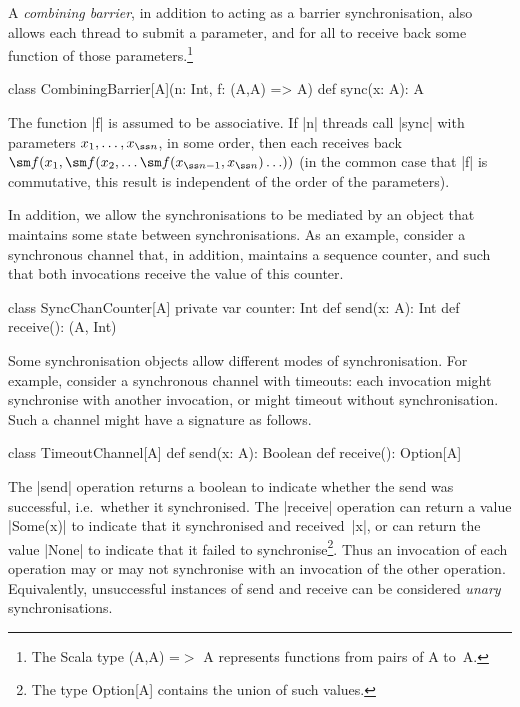 A \emph{combining barrier}, in addition to acting as a barrier
synchronisation, also allows each thread to submit a parameter, and for all to
receive back some function of those parameters.\footnote{The Scala type
  {\scalastyle (A,A) =}$>$ {\scalastyle A} represents functions from pairs of
  {\scalastyle A} to~{\scalastyle A}.}
%
\begin{scala}
class CombiningBarrier[A](n: Int, f: (A,A) => A){
  def sync(x: A): A
}
\end{scala}
%
The function |f| is assumed to be associative.  If |n| threads call |sync|
with parameters $x_1, \ldots, x_{\ss n}$, in some order, then each receives
back $\sm f(x_1, \sm f(x_2, \ldots \sm f(x_{{\ss n}-1}, x_{\ss n}) \ldots ))$
(in the common case that |f| is commutative, this result is independent of the
order of the parameters).

In addition, we allow the synchronisations to be mediated by an object that
maintains some state between synchronisations.  As an example, consider a
synchronous channel that, in addition, maintains a sequence counter, and such
that both invocations receive the value of this counter.
\begin{scala}
class SyncChanCounter[A]{
  private var counter: Int
  def send(x: A): Int
  def receive(): (A, Int)
}
\end{scala}



Some synchronisation objects allow different modes of synchronisation.  For
example, consider a synchronous channel with timeouts: each invocation might
synchronise with another invocation, or might timeout without
synchronisation.  Such a channel might have a signature as follows.
%
\begin{scala}
class TimeoutChannel[A]{
  def send(x: A): Boolean
  def receive(): Option[A]
}
\end{scala}
%
The |send| operation returns a boolean to indicate whether the send was
successful, i.e.~whether it synchronised.  The |receive| operation can return
a value |Some(x)| to indicate that it synchronised and received~|x|, or can
return the value |None| to indicate that it failed to synchronise\footnote{The
  type {\scalashape Option[A]} contains the union of such values.}.  Thus an
invocation of each operation may or may not synchronise with an invocation of
the other operation.  Equivalently, unsuccessful instances of send and receive
can be considered \emph{unary} synchronisations.  

